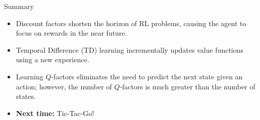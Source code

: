 \documentclass[9pt]{beamer}
\newcommand\lspace{\addtolength{\itemsep}{0.5\baselineskip}}
\begin{document}
\begin{frame}{Summary}

\begin{itemize}\lspace
	\item Discount factors shorten the horizon of RL problems, causing the agent to focus on rewards in the near future.
	\item Temporal Difference (TD) learning incrementally updates value functions using a new experience.
	\item Learning $Q$-factors eliminates the need to predict the next state given an action; however, the number of $Q$-factors is much greater than the number of states.
	\item<2-> \textbf{Next time:} Tic-Tac-Go!
\end{itemize}
	
\end{frame}
\end{document}
